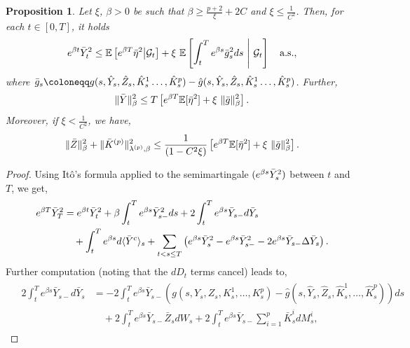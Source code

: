 \documentclass[11pt,a4paper]{article}
\numberwithin{equation}{section}
\theoremstyle{newPlain}
\newtheorem{proposition}[theorem]{Proposition}
\theoremstyle{newDefinition}
\theoremstyle{newRemark}
\begin{document}
{\begin{proposition}
    Let $\xi$, $\beta>0$ be such that $\beta\ge\frac{p+2}{\xi}+2C$ and $\xi\le\frac{1}{C^2}$. Then, for each $t\in[0,T]$, it holds
    \begin{equation}\label{eq:peProp1}
        e^{\beta t}\Bar{Y}_t^2 \le \mathbb{E}\left[e^{\beta T}\Bar{\eta}^2\middle|\mathcal{G}_t\right] + \xi\text{ }\mathbb{E}\left[\int_t^Te^{\beta s}\Bar{g}_s^2ds\text{ }\middle|\text{ }\mathcal{G}_t\right]\quad\text{a.s.},
    \end{equation}
    where $\Bar{g}_s\coloneqq g(s,\hat{Y}_s,\hat{Z}_s,\hat{K}_s^1\ldots,\hat{K}_s^p) - \hat{g}(s,\hat{Y}_s,\hat{Z}_s,\hat{K}_s^1\ldots,\hat{K}_s^p)$. Further,
    \begin{equation}\label{eq:peProp2}
        \|\Bar{Y}\|_\beta^2\le T\left[e^{\beta T}\mathbb{E}[\Bar{\eta}^2] + \xi\text{ }\|\Bar{g}\|_\beta^2\right].
    \end{equation}
    Moreover, if $\xi < \frac{1}{C^2}$, we have,
    \begin{equation}\label{eq:peProp3}
        \|\Bar{Z}\|_\beta^2 + \|\Bar{K}^{(p)}\|_{\lambda^{(p)},\beta}^2 \le \frac{1}{(1-C^2\xi)}\left[e^{\beta T}\mathbb{E}[\Bar{\eta}^2] + \xi\text{ }\|\Bar{    g}\|_\beta^2\right].
    \end{equation}
\end{proposition}
\begin{proof}
    Using It\^o's formula applied to the semimartingale $(e^{\beta s}\Bar{Y}_s^2)$ between $t$ and $T$, we get,
    \begin{align}\label{eq:peProof1}
        \begin{aligned}
            e^{\beta T}\Bar{Y}_T^2 &= e^{\beta t}\Bar{Y}_t^2 + \beta\int_t^Te^{\beta s}\bar{Y}_{s-}^2ds + 2\int_t^Te^{\beta s}\Bar{Y}_{s-}d\bar{Y}_s \\&\quad+\int_t^Te^{\beta s}d\langle\bar{Y}^c\rangle_s + \sum_{t<s\le T}\left(e^{\beta s}\bar{Y}_s^2-e^{\beta s}\bar{Y}_{s-}^2 - 2e^{\beta s}\bar{Y}_{s-}\Delta\bar{Y}_s\right).
            \end{aligned}
    \end{align}
 	Further computation (noting that the $dD_t$ terms cancel) leads to,
    \begin{align}
        &\begin{aligned}\label{eq:peProof2}
        2\int_t^Te^{\beta s}\bar{Y}_{s-}d\bar{Y}_{s} &= -2\int_t^Te^{\beta s}\bar{Y}_{s-}(g(s,Y_s,Z_s,K_s^1,\ldots,K_s^p) - \hat{g}(s,\hat{Y}_s,\hat{Z}_s,\hat{K}_s^1,\ldots,\hat{K}_s^p))ds \\
        &\quad+ 2\int_t^Te^{\beta s}\bar{Y}_{s-}\bar{Z}_sdW_s + 2\int_t^Te^{\beta s}\bar{Y}_{s-}\sum_{i=1}^p\bar{K}_s^idM_s^i,

\end{aligned}
\end{align}
\end{proof}}
\end{document}
